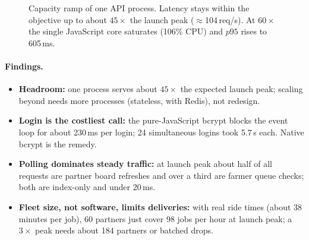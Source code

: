 \documentclass[11pt,a4paper]{article}
\begin{document}
\begin{figure}[H]\centering
{}
\caption{Capacity ramp of one API process. Latency stays within the objective up to about $45\times$ the launch peak ($\approx$104\,req/s). At $60\times$ the single JavaScript core saturates (106\% CPU) and $p95$ rises to 605\,ms.}
\end{figure}

\paragraph{Findings.}
\begin{itemize}
  \item \textbf{Headroom:} one process serves about $45\times$ the expected launch peak; scaling beyond needs more processes (stateless, with Redis), not redesign.
  \item \textbf{Login is the costliest call:} the pure-JavaScript bcrypt blocks the event loop for about 230\,ms per login; 24 simultaneous logins took 5.7\,s each. Native bcrypt is the remedy.
  \item \textbf{Polling dominates steady traffic:} at launch peak about half of all requests are partner board refreshes and over a third are farmer queue checks; both are index-only and under 20\,ms.
  \item \textbf{Fleet size, not software, limits deliveries:} with real ride times (about 38 minutes per job), 60 partners just cover 98 jobs per hour at launch peak; a $3\times$ peak needs about 184 partners or batched drops.
\end{itemize}
\end{document}

